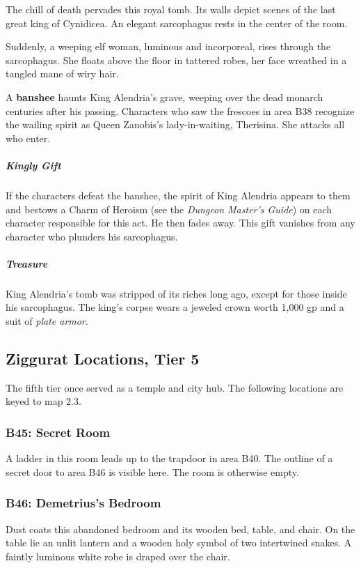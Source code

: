 \documentclass[10pt,a4paper,twoside,bg=print,twocolumn,openany,nodeprecatedcode]{dndbook}
\begin{document}
\begin{DndReadAloud}{}
The chill of death pervades this royal tomb. Its walls depict scenes of the last great king of Cynidicea. An elegant sarcophagus rests in the center of the room.

Suddenly, a weeping elf woman, luminous and incorporeal, rises through the sarcophagus. She floats above the floor in tattered robes, her face wreathed in a tangled mane of wiry hair.

\end{DndReadAloud}

A \textbf{banshee} haunts King Alendria's grave, weeping over the dead monarch centuries after his passing. Characters who saw the frescoes in area B38 recognize the wailing spirit as Queen Zanobis's lady-in-waiting, Therisina. She attacks all who enter.

\subparagraph{Kingly Gift}
If the characters defeat the banshee, the spirit of King Alendria appears to them and bestows a Charm of Heroism (see the \textit{Dungeon Master's Guide}) on each character responsible for this act. He then fades away. This gift vanishes from any character who plunders his sarcophagus.

\subparagraph{Treasure}
King Alendria's tomb was stripped of its riches long ago, except for those inside his sarcophagus. The king's corpse wears a jeweled crown worth 1,000 gp and a suit of \textit{plate armor}.

\subsection{Ziggurat Locations, Tier 5}
The fifth tier once served as a temple and city hub. The following locations are keyed to map 2.3.

\subsubsection{B45: Secret Room}
A ladder in this room leads up to the trapdoor in area B40. The outline of a secret door to area B46 is visible here. The room is otherwise empty.

\subsubsection{B46: Demetrius's Bedroom}
\begin{DndReadAloud}{}
Dust coats this abandoned bedroom and its wooden bed, table, and chair. On the table lie an unlit lantern and a wooden holy symbol of two intertwined snakes. A faintly luminous white robe is draped over the chair.

\end{DndReadAloud}
\end{document}
